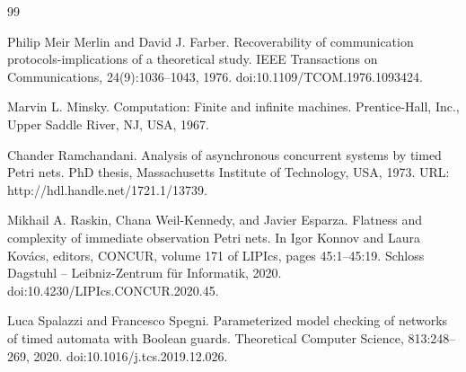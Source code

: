 \documentclass[10pt,a4paper]{article}
\begin{document}
\begin{thebibliography}{99}
\par\noindent    Philip Meir Merlin and David J. Farber.  Recoverability of communication protocols-implications of a theoretical study.  IEEE Transactions on Communications, 24(9):1036--1043, 1976.  doi:10.1109/TCOM.1976.1093424.  

\par\noindent    Marvin L. Minsky.  Computation: Finite and infinite machines.  Prentice-Hall, Inc., Upper Saddle River, NJ, USA, 1967.  

\par\noindent    Chander Ramchandani.  Analysis of asynchronous concurrent systems by timed Petri nets.  PhD thesis, Massachusetts Institute of Technology, USA, 1973.  URL: http://hdl.handle.net/1721.1/13739.  

\par\noindent    Mikhail A. Raskin, Chana Weil-Kennedy, and Javier Esparza.  Flatness and complexity of immediate observation Petri nets.  In Igor Konnov and Laura Kovács, editors, CONCUR, volume 171 of LIPIcs, pages 45:1--45:19. Schloss Dagstuhl -- Leibniz-Zentrum für Informatik, 2020.  doi:10.4230/LIPIcs.CONCUR.2020.45.  

\par\noindent    Luca Spalazzi and Francesco Spegni.  Parameterized model checking of networks of timed automata with Boolean guards.  Theoretical Computer Science, 813:248--269, 2020.  doi:10.1016/j.tcs.2019.12.026.  

\end{thebibliography}
\end{document}
